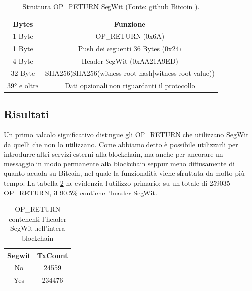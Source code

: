 \begin{table}
	\begin{center}
		\begin{tabular}{|c|c|}
			\hline
			\textbf{Bytes} & \textbf{Funzione} \\ 
			\hline 
			1 Byte	& OP\_RETURN (0x6A) \\ 
			\hline 
			1 Byte	& Push dei seguenti 36 Bytes (0x24) \\ 
			\hline 
			4 Byte	& Header SegWit (0xAA21A9ED) \\ 
			\hline 
			32 Byte	& SHA256(SHA256(witness root hash|witness root value)) \\ 
			\hline 
			39° e oltre	&  Dati opzionali non riguardanti il protocollo\\ 
			\hline
		\end{tabular}
		\caption{Struttura OP\_RETURN SegWit (Fonte: github Bitcoin \cite{bip141}).}
		\label{seg}
	\end{center}
\end{table} 

\subsection{Risultati}

Un primo calcolo significativo distingue gli OP\_RETURN che utilizzano SegWit da quelli che non lo utilizzano. Come abbiamo detto è possibile utilizzarli per introdurre altri servizi esterni alla blockchain, ma anche per ancorare un messaggio in modo permanente alla blockchain seppur meno diffusamente di quanto accada su Bitcoin, nel quale la funzionalità viene sfruttata da molto più tempo. La tabella \ref{segwityn} ne evidenzia l'utilizzo primario: su un totale di 259035 OP\_RETURN, il 90.5\% contiene l'header SegWit.

\begin{table}
	\begin{center}
		\begin{tabular}{|c|c|}
			\hline 
			\textbf{Segwit} & \textbf{TxCount} \\ 
			\hline 
			No & 24559 \\ 
			\hline 
			Yes & 234476 \\ 
			\hline 
		\end{tabular} 
		\caption{OP\_RETURN contenenti l'header SegWit nell'intera blockchain}
		\label{segwityn}
	\end{center}
\end{table}

